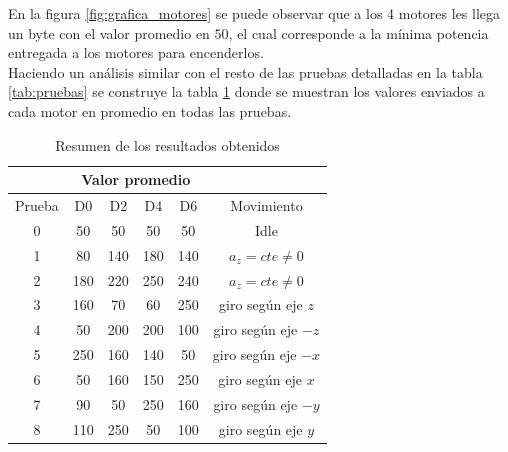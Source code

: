 \documentclass[spanish,12pt,a4paper,titlepage]{report}
\begin{document}
En la figura \ref{fig:grafica_motores} se puede observar que a los 4 motores les llega un byte con el valor promedio en $50$, el cual corresponde a la mínima potencia entregada a los motores para encenderlos.\\

Haciendo un análisis similar con el resto de las pruebas detalladas en la tabla \ref{tab:pruebas} se construye la tabla \ref{tab:resumen_snif} donde se muestran los valores enviados a cada motor en promedio en todas las pruebas.\\

\begin{table}[H]
\begin{center}
\begin{tabular}{c|c|c|c|c|c|} 
\cline{2-5}
& \multicolumn{4}{c|}{\cellcolor[gray]{0.8} Valor promedio} \\ \hline
\multicolumn{1}{|c|}{\cellcolor[gray]{0.8} Prueba} & \cellcolor[gray]{0.8} D0 & \cellcolor[gray]{0.8} D2 & \cellcolor[gray]{0.8} D4 & \cellcolor[gray]{0.8} D6 & \cellcolor[gray]{0.8} Movimiento \\ \hline
\multicolumn{1}{|c|}{\cellcolor[gray]{0.8}0} & 50 & 50 & 50 & 50 & Idle \\ \hline
\multicolumn{1}{|c|}{\cellcolor[gray]{0.8}1} & 80 & 140 & 180 & 140 & $a_z=cte\neq 0$\\ \hline
\multicolumn{1}{|c|}{\cellcolor[gray]{0.8}2} & 180 & 220 & 250 & 240 & $a_z=cte\neq 0$ \\ \hline \hline
\multicolumn{1}{|c|}{\cellcolor[gray]{0.8}3} & 160 & 70 & 60 & 250 & giro según eje $z$ \\ \hline
\multicolumn{1}{|c|}{\cellcolor[gray]{0.8}4} & 50 & 200 & 200 & 100 & giro según eje $-z$\\ \hline \hline
\multicolumn{1}{|c|}{\cellcolor[gray]{0.8}5} & 250 & 160 & 140 & 50 & giro según eje $-x$\\ \hline
\multicolumn{1}{|c|}{\cellcolor[gray]{0.8}6} & 50 & 160 & 150 & 250 & giro según eje $x$ \\ \hline
\multicolumn{1}{|c|}{\cellcolor[gray]{0.8}7} & 90 & 50 & 250 & 160 & giro según eje $-y$\\ \hline
\multicolumn{1}{|c|}{\cellcolor[gray]{0.8}8} & 110 & 250 & 50 &  100 & giro según eje $y$\\ \hline
\end{tabular} 
\caption{Resumen de los resultados obtenidos}
\label{tab:resumen_snif}
\end{center}
\end{table}
\end{document}
